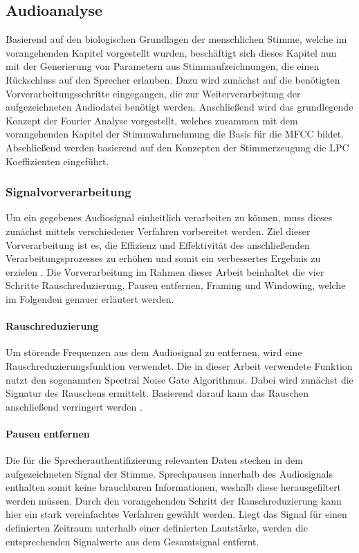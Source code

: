 \subsection{Audioanalyse}
Basierend auf den biologischen Grundlagen der menschlichen Stimme, welche im vorangehenden Kapitel vorgestellt wurden, beschäftigt sich dieses Kapitel nun mit der Generierung von Parametern aus Stimmaufzeichnungen, die einen Rückschluss auf den Sprecher erlauben.
Dazu wird zunächst auf die benötigten Vorverarbeitungsschritte eingegangen, die zur Weiterverarbeitung der aufgezeichneten Audiodatei benötigt werden.
Anschließend wird das grundlegende Konzept der Fourier Analyse vorgestellt, welches zusammen mit dem vorangehenden Kapitel der Stimmwahrnehmung die Basis für die \ac{MFCC} bildet.
Abschließend werden basierend auf den Konzepten der Stimmerzeugung die \ac{LPC} Koeffizienten eingeführt.

\subsubsection{Signalvorverarbeitung}
Um ein gegebenes Audiosignal einheitlich verarbeiten zu können, muss dieses zunächst mittels verschiedener Verfahren vorbereitet werden.
Ziel dieser Vorverarbeitung ist es, die Effizienz und Effektivität des anschließenden Verarbeitungsprozesses zu erhöhen und somit ein verbessertes Ergebnis zu erzielen \autocite[vgl.][S. 11672]{lokesh_speech_2019}.
Die Vorverarbeitung im Rahmen dieser Arbeit beinhaltet die vier Schritte Rauschreduzierung, Pausen entfernen, Framing und Windowing, welche im Folgenden genauer erläutert werden.

\paragraph{Rauschreduzierung}\label{sec:Rauschreduzierung}
Um störende Frequenzen aus dem Audiosignal zu entfernen, wird eine Rauschreduzierungsfunktion verwendet.
Die in dieser Arbeit verwendete Funktion nutzt den sogenannten Spectral Noise Gate Algorithmus.
Dabei wird zunächst die Signatur des Rauschens ermittelt.
Basierend darauf kann das Rauschen anschließend verringert werden \autocite[vgl.][S. 25]{kiapuchinski_spectral_2012}.

\paragraph{Pausen entfernen}
Die für die Sprecherauthentifizierung relevanten Daten stecken in dem aufgezeichneten Signal der Stimme.
Sprechpausen innerhalb des Audiosignals enthalten somit keine brauchbaren Informationen, weshalb diese herausgefiltert werden müssen.
Durch den vorangehenden Schritt der Rauschreduzierung kann hier ein stark vereinfachtes Verfahren gewählt werden.
Liegt das Signal für einen definierten Zeitraum unterhalb einer definierten Lautstärke, werden die entsprechenden Signalwerte aus dem Gesamtsignal entfernt.

